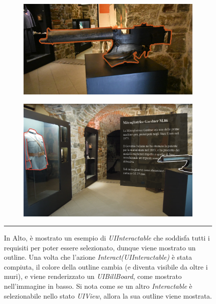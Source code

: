 \documentclass[10pt, openany]{article}
\begin{document}
  \begin{figure}[t]
    \begin{mdframed}[
      linecolor=black,
      linewidth=1pt,
      innertopmargin=6pt,
      innerbottommargin=6pt,
      innerleftmargin=6pt,
      innerrightmargin=6pt
    ]
        \begin{subfigure}[b]{\textwidth}
        \includegraphics[width=\textwidth]{UI_eligeable_for_selection.png}\\
        \end{subfigure}
        \begin{subfigure}[b]{\textwidth}
        \includegraphics[width=\textwidth]{UI_UIView_State_with_another_eligeable_for_selection.png}
        \end{subfigure}
      \vspace{3pt}
      \hrule
      \vspace{3pt}
      \caption{In Alto, \`e mostrato un esempio di \textit{UIInteractable} che soddisfa tutti i requisiti per poter essere selezionato, dunque viene mostrato un outline. Una volta che 
        l'azione \textit{Interact(UIInteractable)} \`e stata compiuta, il colore della outline cambia (e diventa visibile da oltre i muri), e viene renderizzato un 
        \textit{UIBillBoard}, come mostrato nell'immagine in basso\protect\footnotemark. 
        Si nota come se un altro \textit{Interactable} \`e selezionabile nello stato \textit{UIView}, allora la sua outline viene mostrata.}
      \label{vr:ui:figinteraction}
    \end{mdframed}
  \end{figure}
  \FloatBarrier
\end{document}
